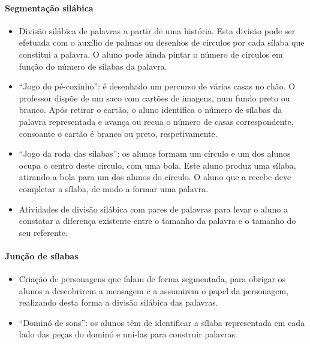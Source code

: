 \documentclass[
  oneside,
  11pt, a4paper,
  footinclude=true,
  headinclude=true,
  cleardoublepage=empty
]{scrbook}
\begin{document}
\paragraph{Segmentação silábica}
\begin{itemize}
  \item Divisão silábica de palavras a partir de uma história. Esta divisão pode ser efetuada com o auxílio de palmas ou desenhos de círculos por cada sílaba que constitui a palavra. O aluno pode ainda pintar o número de círculos em função do número de sílabas da palavra.
  \item “Jogo do pé-coxinho”: é desenhado um percurso de várias casas no chão. O professor dispõe de um saco com cartões de imagens, num fundo preto ou branco. Após retirar o cartão, o aluno identifica o número de sílabas da palavra representada e avança ou recua o número de casas correspondente, consoante o cartão é branco ou preto, respetivamente.
  \item “Jogo da roda das sílabas”: os alunos formam um círculo e um dos alunos ocupa o centro deste círculo, com uma bola. Este aluno produz uma sílaba, atirando a bola para um dos alunos do círculo. O aluno que a recebe deve completar a sílaba, de modo a formar uma palavra.
  \item Atividades de divisão silábica com pares de palavras para levar o aluno a constatar a diferença existente entre o tamanho da palavra e o tamanho do seu referente.
\end{itemize}

\paragraph{Junção de sílabas}
\begin{itemize}
  \item Criação de personagens que falam de forma segmentada, para obrigar os alunos a descobrirem a mensagem e a assumirem o papel da personagem, realizando desta forma a divisão silábica das palavras.
  \item “Dominó  de  sons”:  os  alunos  têm  de  identificar  a  sílaba representada em cada lado das peças do dominó e uni-las para construir palavras.
\end{itemize}
\end{document}
